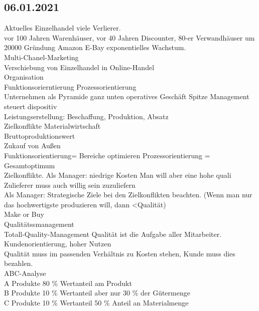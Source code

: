 \documentclass{article}
\begin{document}
	\subsection*{06.01.2021}
	Aktuelles Einzelhandel viele Verlierer. \\
	vor 100 Jahren Warenhäuser, vor 40 Jahren Discounter, 80-er Verwandhäuser um 20000 Gründung Amazon E-Bay exponentielles Wachstum. \\
	Multi-Chanel-Marketing \\
	Verschiebung von Einzelhandel in Online-Handel \\
	Organisation \\
	Funktionsorierntierung Prozessorientierung \\
	Unternehmen als Pyramide ganz unten operatives Geschäft Spitze Management steuert dispositiv \\
	Leistungserstellung: Beschaffung, Produktion, Absatz \\
	Zielkonflikte Materialwirtschaft \\
	Bruttoproduktionswert \\
	Zukauf von Außen \\
	
	Funktionsorientierung= Bereiche optimieren
	Prozessorientierung = Gesamtoptimum \\
	
	Zielkonflikte.
	Als Manager: niedrige Kosten
	Man will aber eine hohe quali
	Zulieferer muss auch willig sein zuzuliefern \\
	
	Als Manager: Strategische Ziele bei den Zielkonflikten beachten. (Wenn man nur das hochwertigste produzieren will, dann <Qualität) \\
	Make or Buy \\
	Qualitätssmanagement \\
	Totall-Quality-Management Qualität ist die Aufgabe aller Mitarbeiter. Kundenorientierung, hoher Nutzen \\
	Qualität muss im passenden Verhältnis zu Kosten stehen, Kunde muss dies bezahlen. \\
	ABC-Analyse \\
	A Produkte 80 \% Wertanteil am Produkt \\
	B Produkte 10 \% Wertanteil aber nur 30 \% der Gütermenge \\
	C Produkte 10 \% Wertanteil 50 \% Anteil an Materialmenge \\
\end{document}
